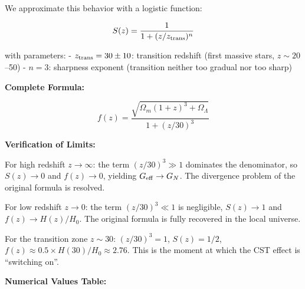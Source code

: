 \documentclass[11pt,a4paper]{article}
\begin{document}
We approximate this behavior with a logistic function:

\[S(z) = \frac{1}{1 + (z/z_{\rm trans})^n}\]

with parameters: - \(z_{\rm trans} = 30 \pm 10\): transition redshift
(first massive stars, \(z \sim 20\)--50) - \(n = 3\): sharpness exponent
(transition neither too gradual nor too sharp)

\textbf{Complete Formula:}

\[\boxed{f(z) = \frac{\sqrt{\Omega_m(1+z)^3 + \Omega_\Lambda}}{1 + (z/30)^3}}\]

\textbf{Verification of Limits:}

For high redshift \(z \to \infty\): the term \((z/30)^3 \gg 1\)
dominates the denominator, so \(S(z) \to 0\) and \(f(z) \to 0\),
yielding \(G_{\rm eff} \to G_N\). The divergence problem of the original
formula is resolved.

For low redshift \(z \to 0\): the term \((z/30)^3 \ll 1\) is negligible,
\(S(z) \to 1\) and \(f(z) \to H(z)/H_0\). The original formula is fully
recovered in the local universe.

For the transition zone \(z \sim 30\): \((z/30)^3 = 1\), \(S(z) = 1/2\),
\(f(z) \approx 0.5 \times H(30)/H_0 \approx 2.76\). This is the moment
at which the CST effect is ``switching on''.

\textbf{Numerical Values Table:}
\end{document}
